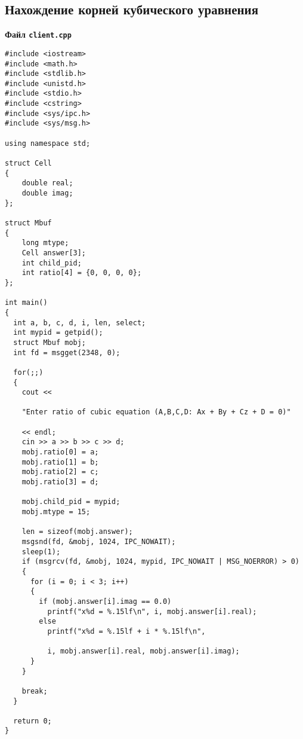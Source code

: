 \documentclass[a4paper,12pt]{extarticle}
\begin{document}
\subsection{Нахождение корней кубического уравнения}\label{code:cube-equation}
\centerline{\textbf{Файл \texttt{client.cpp}}}
\begin{verbatim}
#include <iostream>
#include <math.h>
#include <stdlib.h>
#include <unistd.h>
#include <stdio.h>
#include <cstring>
#include <sys/ipc.h>
#include <sys/msg.h>

using namespace std;

struct Cell
{
    double real;
    double imag;
};

struct Mbuf
{
    long mtype;
    Cell answer[3];
    int child_pid;
    int ratio[4] = {0, 0, 0, 0};
};

int main()
{
  int a, b, c, d, i, len, select;
  int mypid = getpid();
  struct Mbuf mobj;
  int fd = msgget(2348, 0);

  for(;;)
  {
    cout << 
    
    "Enter ratio of cubic equation (A,B,C,D: Ax + By + Cz + D = 0)"
    
    << endl;
    cin >> a >> b >> c >> d;
    mobj.ratio[0] = a;
    mobj.ratio[1] = b;
    mobj.ratio[2] = c;
    mobj.ratio[3] = d;

    mobj.child_pid = mypid;
    mobj.mtype = 15;

    len = sizeof(mobj.answer);
    msgsnd(fd, &mobj, 1024, IPC_NOWAIT);
    sleep(1);
    if (msgrcv(fd, &mobj, 1024, mypid, IPC_NOWAIT | MSG_NOERROR) > 0)
    {
      for (i = 0; i < 3; i++)
      {
        if (mobj.answer[i].imag == 0.0)
          printf("x%d = %.15lf\n", i, mobj.answer[i].real);
        else
          printf("x%d = %.15lf + i * %.15lf\n",
          
          i, mobj.answer[i].real, mobj.answer[i].imag);
      }
    }

    break;
  }

  return 0;
}
\end{verbatim}
\hrulefill
\end{document}

